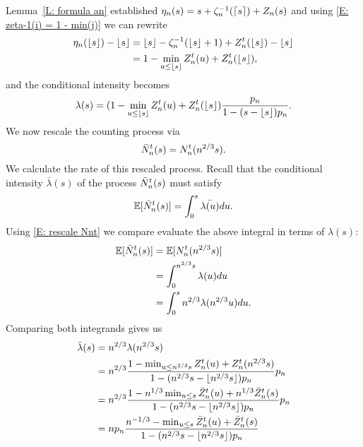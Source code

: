 Lemma~\ref{L: formula an} established $\eta_n(s) = s + \zeta^{-1}_n(\lceil s\rceil) + Z_n(s)$ 
and using \eqref{E: zeta-1(i) = 1 - min(j)} we can rewrite
\begin{equation*}
\begin{aligned}
\eta_n(\lfloor s\rfloor) - \lfloor s\rfloor 
&= \lfloor s\rfloor - \zeta^{-1}_n(\lfloor s\rfloor+1) + Z_n^t(\lfloor s\rfloor) - \lfloor s\rfloor \\
&= 1 - \min_{u \leq \lfloor s\rfloor} Z_n^t(u) + Z_n^t(\lfloor s\rfloor),
\end{aligned}
\end{equation*}
and the conditional intensity becomes
\begin{equation} \label{E: rate Nnt 2}
\lambda(s) = (1 - \min_{u \leq \lfloor s\rfloor} Z_n^t(u) + Z_n^t(\lfloor s\rfloor) \frac{p_n}{1-(s-\lfloor s\rfloor)p_n}.
\end{equation}
We now rescale the counting process via
\begin{equation} \label{E: rescale Nnt}
\bar{N}_n^t(s) = N_n^t(n^{2 / 3}s).
\end{equation}
We calculate the rate of this rescaled process.
Recall that the conditional intensity $\bar{\lambda}(s)$ of the process $\bar{N}_n^t(s)$ must satisfy
\begin{equation}
\mathbb{E}[\bar{N}_n^t(s)] = \int_{0}^{s} \bar{\lambda(u)} du.
\end{equation}
Using \eqref{E: rescale Nnt} we compare evaluate the above integral in terms of $\lambda(s)$:
\begin{equation*}
\begin{aligned}
\mathbb{E}[\bar{N}_n^t(s)]
&= \mathbb{E}[N_n^t(n^{2 / 3}s)] \\
&= \int_{0}^{n^{2 / 3}s} \lambda(u) du \\
&= \int_{0}^{s} n^{2 / 3} \lambda(n^{2 / 3}u) du.
\end{aligned}
\end{equation*}
Comparing both integrands gives us
\begin{equation*}
\begin{aligned}
\bar{\lambda}(s)
&= n^{2 / 3} \lambda(n^{2 / 3}s) \\
&= n^{2 / 3} \frac{1 - \min_{u \leq n^{2 / 3}s} Z_n^t(u) + Z_n^t(n^{2 / 3}s)}{1 - (n^{2 / 3}s - \lfloor n^{2 / 3}s\rfloor)p_n} p_n \\
&= n^{2 / 3} \frac{1 - n^{1 / 3} \min_{u \leq s} \bar{Z}^t_n(u) + n^{1 / 3}\bar{Z}^t_n(s)}{1 - (n^{2 / 3}s - \lfloor n^{2 / 3}s\rfloor)p_n} p_n \\
&= n p_n \frac{n^{-1 / 3} - \min_{u \leq s} \bar{Z}^t_n(u) + \bar{Z}^t_n(s)}{1 - (n^{2 / 3}s - \lfloor n^{2 / 3}s\rfloor)p_n}
\end{aligned}
\end{equation*}

